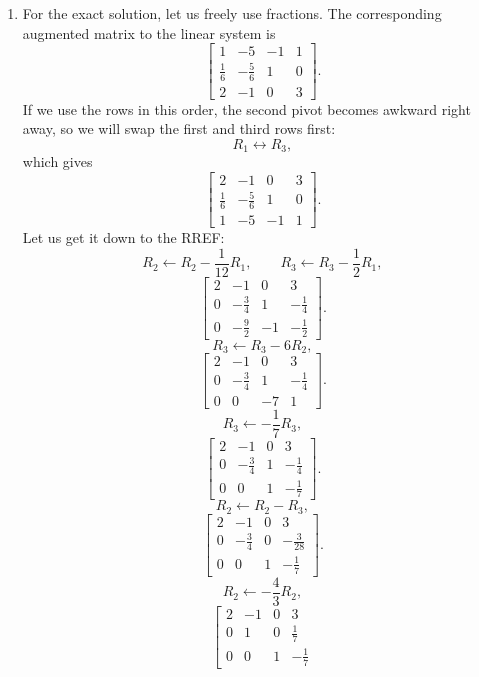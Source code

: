 \documentclass[10pt]{extarticle}
\begin{document}
\begin{enumerate}[label=(\alph*)]
\item For the exact solution, let us freely use fractions. The corresponding augmented matrix to the linear system is
\[
\left[
\begin{array}{ccc|c}
1 & -5 & -1 & 1\\
\frac{1}{6} & -\frac{5}{6} & 1 & 0\\
2 & -1 & 0 & 3
\end{array}
\right].
\]
If we use the rows in this order, the second pivot becomes awkward right away, so we will swap the first and third rows first:
\[
R_1\leftrightarrow R_3,
\]
which gives
\[
\left[
\begin{array}{ccc|c}
2 & -1 & 0 & 3\\
\frac{1}{6} & -\frac{5}{6} & 1 & 0\\
1 & -5 & -1 & 1
\end{array}
\right].
\]
Let us get it down to the RREF:
\[
R_2\leftarrow R_2-\frac{1}{12}R_1,\qquad
R_3\leftarrow R_3-\frac{1}{2}R_1,
\]
\[
\left[
\begin{array}{ccc|c}
2 & -1 & 0 & 3\\
0 & -\frac{3}{4} & 1 & -\frac{1}{4}\\
0 & -\frac{9}{2} & -1 & -\frac{1}{2}
\end{array}
\right].
\]
\[
R_3\leftarrow R_3-6R_2,
\]
\[
\left[
\begin{array}{ccc|c}
2 & -1 & 0 & 3\\
0 & -\frac{3}{4} & 1 & -\frac{1}{4}\\
0 & 0 & -7 & 1
\end{array}
\right].
\]
\[
R_3\leftarrow -\frac{1}{7}R_3,
\]
\[
\left[
\begin{array}{ccc|c}
2 & -1 & 0 & 3\\
0 & -\frac{3}{4} & 1 & -\frac{1}{4}\\
0 & 0 & 1 & -\frac{1}{7}
\end{array}
\right].
\]
\[
R_2\leftarrow R_2-R_3,
\]
\[
\left[
\begin{array}{ccc|c}
2 & -1 & 0 & 3\\
0 & -\frac{3}{4} & 0 & -\frac{3}{28}\\
0 & 0 & 1 & -\frac{1}{7}
\end{array}
\right].
\]
\[
R_2\leftarrow -\frac{4}{3}R_2,
\]
\[
\left[
\begin{array}{ccc|c}
2 & -1 & 0 & 3\\
0 & 1 & 0 & \frac{1}{7}\\
0 & 0 & 1 & -\frac{1}{7}

\end{array}\]
\end{enumerate}
\end{document}
